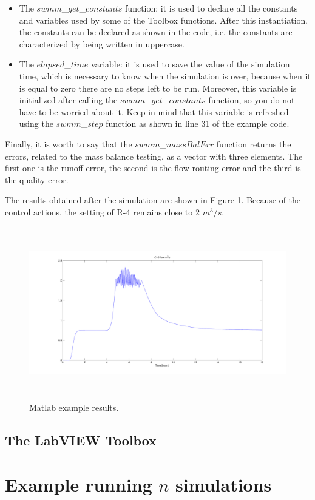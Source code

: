 \documentclass[11pt, letterpaper]{article}
\begin{document}
\begin{itemize}
	\item The $swmm$\_$get$\_$constants$ function: it is used to declare all the constants and variables used by some of the Toolbox functions. After this instantiation, the constants can be declared as shown in the code, i.e. the constants are characterized by being written in uppercase.
	\item The $elapsed$\_$time$ variable: it is used to save the value of the simulation time, which is necessary to know when the simulation is over, because when it is equal to zero there are no steps left to be run. Moreover, this variable is initialized after calling the $swmm$\_$get$\_$constants$ function, so you do not have to be worried about it. Keep in mind that this variable is refreshed using the $swmm$\_$step$ function as shown in line 31 of the example code.
\end{itemize}

\setlength\parindent{12pt}
Finally, it is worth to say that the $swmm$\_$massBalErr$ function returns the errors, related to the mass balance testing, as a vector with three elements. The first one is the runoff error, the second is the flow routing error and the third is the quality error.

\setlength\parindent{12pt}
The results obtained after the simulation are shown in Figure \ref{fig:matlab_ex}. Because of the control actions, the setting of R-4 remains close to 2 $m^3/s$.

\begin{figure}[ht!]
\begin{center}
\includegraphics[height=7.5cm]{figs/matlab_1}
\caption{Matlab example results.}
\label{fig:matlab_ex}
\end{center}
\end{figure}

\subsection{The LabVIEW Toolbox}
\pagebreak

\section{Example running $n$ simulations}
\pagebreak
\end{document}
